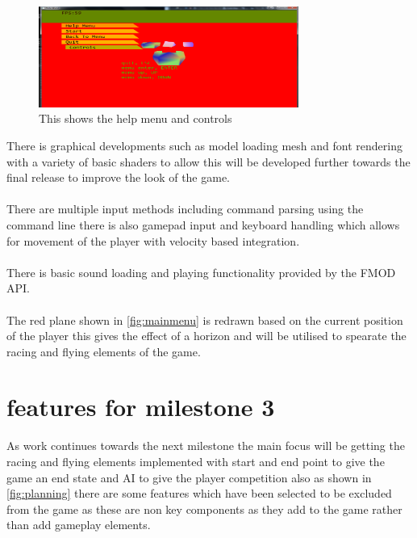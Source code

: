\documentclass[conference,backref=page]{acmsiggraph}
\begin{document}
\begin{figure}[ht!]
  \includegraphics[height=1.3in]{images/helpmenu}
  \caption{This shows the help menu and controls}
  \label{fig:helpmenu}
\end{figure}

There is graphical developments such as model loading mesh and font rendering with a variety of basic shaders to allow this will be developed further towards the final release to improve the look of the game.  
\nolinebreak
\\\\There are multiple input methods including command parsing using the command line there is also gamepad input and keyboard handling which allows for movement of the player with velocity based integration.
\nolinebreak
\\\\There is basic sound loading and playing functionality provided by the FMOD API. 
\nolinebreak
\\\\The red plane shown in \ref{fig:mainmenu} is redrawn based on the current position of the player this gives the effect of a horizon and will be utilised to spearate the racing and flying elements of the game.

\section{features for milestone 3}
As work continues towards the next milestone the main focus will be getting the racing and flying elements implemented with start and end point to give the game an end state and AI to give the player competition also as shown in \ref{fig:planning} there are some features which have been selected to be excluded from the game as these are non key components as they add to the game rather than add gameplay elements. 
\end{document}

